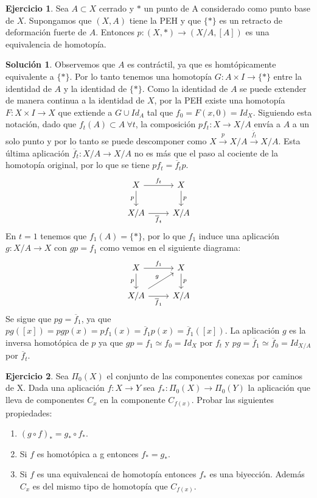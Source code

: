 \documentclass{article}
\theoremstyle{plain}
\theoremstyle{definition}
\newtheorem{exercise}{Ejercicio}
\newtheorem*{sol*}{Solución}
\begin{document}
\newpage
\begin{exercise}
Sea $A\subset X$ cerrado y $*$ un punto de A considerado como punto base de $X$. Supongamos que $(X,A)$ tiene la PEH y que $\{*\}$ es un retracto de deformación fuerte de $A$. Entonces $p:(X,*)\to(X/A,[A])$ es una equivalencia de homotopía.
\end{exercise}
\begin{sol*}
Observemos que $A$ es contráctil, ya que es homtópicamente equivalente a $\{*\}$. Por lo tanto tenemos una homotopía $G:A\times I\to \{*\}$ entre la identidad de $A$ y la identidad de $\{*\}$. Como la identidad de $A$ se puede extender de manera continua a la identidad de $X$, por la PEH existe una homotopía $F:X\times I\to X$  que extiende a $G\cup Id_A$ tal que $f_0=F(x,0)=Id_X$. Siguiendo esta notación, dado que $f_t(A)\subset A\ \forall t$, la composición $pf_t:X\to X/A$ envía a $A$ a un solo punto y por lo tanto se puede descomponer como $X\overset{p}{\rightarrow} X/A\overset{\overline{f}_t}{\rightarrow}X/A$. Esta última aplicación $\overline{f}_t:X/A\to X/A$ no es más que el paso al cociente de la homotopía original, por lo que se tiene $pf_t=\overline{f}_tp$.
\[
\begin{tikzcd}
X\arrow[r,"f_t"]\arrow[d,"p"'] &X\arrow[d,"p"]\\
X/A\arrow[r,"\overline{f}_t"'] & X/A
\end{tikzcd}
\]
 En $t=1$ tenemos que $f_1(A)=\{*\}$, por lo que $f_1$ induce una aplicación $g:X/A\to X$ con $gp=f_1$ como vemos en el siguiente diagrama:
\[
\begin{tikzcd}
X\arrow[r,"f_1"]\arrow[d,"p"'] &X\arrow[d,"p"]\\
X/A\arrow[ur,"g"]\arrow[r,"\overline{f}_1"'] & X/A
\end{tikzcd}
\]
Se sigue que $pg=\overline{f}_1$, ya que $pg([x])=pgp(x)=pf_1(x)=\overline{f}_1p(x)=\overline{f}_1([x])$. La aplicación $g$ es la inversa homotópica de $p$ ya que $gp=f_1\simeq f_0=Id_X$ por $f_t$ y $pg=\overline{f}_1\simeq\overline{f}_0=Id_{X/A}$ por $\overline{f}_t$. 
\end{sol*}
\newpage
\begin{exercise}
Sea $\Pi_0(X)$ el conjunto de las componentes conexas por caminos de X. Dada una aplicación $f:X\to Y$ sea $f_*:\Pi_0(X)\to\Pi_0(Y)$ la aplicación que lleva de componentes $C_x$ en la componente $C_{f(x)}$. Probar las siguientes propiedades:
\begin{enumerate}
\item $(g\circ f)_* = g_*\circ f_*$.
\item Si $f$ es homotópica a g entonces $f_*=g_*$.
\item Si $f$ es una equivalencai de homotopía entonces $f_*$ es una biyección. Además $C_x$ es del mismo tipo de homotopía que $C_{f(x)}$.
\end{enumerate}
\end{exercise}
\end{document}
